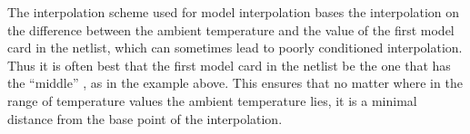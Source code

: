 The interpolation scheme used for model interpolation bases the interpolation
on the difference between the ambient temperature and the  value
of the first model card in the netlist, which can sometimes lead to poorly
conditioned interpolation.  Thus it is often best that the first model card in
the netlist be the one that has the ``middle'' , as in the
example above.  This ensures that no matter where in the range of temperature
values the ambient temperature lies, it is a minimal distance from the base
point of the interpolation.
